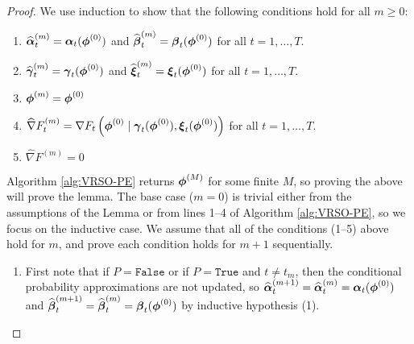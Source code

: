 \begin{proof}

    We use induction to show that the following conditions hold for all $m \geq 0$:

    \begin{enumerate}
        \item $\widehat {\boldsymbol{\alpha}}^{(m)}_t = \boldsymbol{\alpha}_t(\boldsymbol{\phi}^{(0)})$ and $\widehat {\boldsymbol{\beta}}^{(m)}_{t} = \boldsymbol{\beta}_t(\boldsymbol{\phi}^{(0)})$ for all $t = 1,\ldots,T$.
        \item $\widehat {\boldsymbol{\gamma}}^{(m)}_{t} = \boldsymbol{\gamma}_t(\boldsymbol{\phi}^{(0)})$ and $\widehat {\boldsymbol{\xi}}^{(m)}_{t} = \boldsymbol{\xi}_t(\boldsymbol{\phi}^{(0)})$ for all $t = 1,\ldots,T$.
        \item $\boldsymbol{\phi}^{(m)} = \boldsymbol{\phi}^{(0)}$
        \item $\widehat \nabla F^{(m)}_{t} = \nabla F_t\left(\boldsymbol{\phi}^{(0)} \mid \boldsymbol{\gamma}_t(\boldsymbol{\phi}^{(0)}),\boldsymbol{\xi}_t(\boldsymbol{\phi}^{(0)})\right)$ for all $t = 1,\ldots,T$.
        \item $\widehat \nabla F^{(m)} = 0$
    \end{enumerate}

    Algorithm \ref{alg:VRSO-PE} returns $\boldsymbol{\phi}^{(M)}$ for some finite $M$, so proving the above will prove the lemma. 
    The base case ($m=0$) is trivial either from the assumptions of the Lemma or from lines 1--4 of Algorithm \ref{alg:VRSO-PE}, so we focus on the inductive case. We assume that all of the conditions (1--5) above hold for $m$, and prove each condition holds for $m+1$ sequentially.

    \begin{enumerate}
        \item First note that if $P = \texttt{False}$ or if $P = \texttt{True}$ and $t \neq t_m$, then the conditional probability approximations are not updated, so $\widehat {\boldsymbol{\alpha}}^{(m+1)}_t = \widehat {\boldsymbol{\alpha}}^{(m)}_t  = \boldsymbol{\alpha}_t(\boldsymbol{\phi}^{(0)})$ and $\widehat {\boldsymbol{\beta}}^{(m+1)}_t = \widehat {\boldsymbol{\beta}}^{(m)}_t = \boldsymbol{\beta}_t(\boldsymbol{\phi}^{(0)})$ by inductive hypothesis (1).
        

\end{enumerate}
\end{proof}
